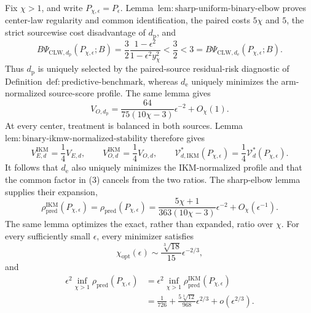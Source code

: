 Fix \(\chi>1\), and write \(P_{\chi,\epsilon}=P_\epsilon\).  Lemma~\(\mathrm{lem{:}sharp\text{-}uniform\text{-}binary\text{-}elbow}\) proves center-law regularity and common identification, the paired costs \(5\chi\) and \(5\), the strict sourcewise cost disadvantage of \(d_{\mathrm p}\), and
\[
 B\Psi_{\mathrm{CLW},d_{\mathrm p}}(P_{\chi,\epsilon};B)
 =\frac32\frac{1-\epsilon^2}{1-\epsilon^2y_\chi^2}
 <\frac32<3
 =B\Psi_{\mathrm{CLW},d_{\mathrm e}}(P_{\chi,\epsilon};B). \tag{1}
\]
Thus \(d_{\mathrm p}\) is uniquely selected by the paired-source residual-risk diagnostic of Definition~\(\mathrm{def{:}predictive\text{-}benchmark}\), whereas \(d_{\mathrm e}\) uniquely minimizes the arm-normalized source-score profile.  The same lemma gives
\[
 V_{O,d_{\mathrm p}}
 =\frac{64}{75(10\chi-3)}\epsilon^{-2}+O_\chi(1).       \tag{2}
\]
At every center, treatment is balanced in both sources.  Lemma~\(\mathrm{lem{:}binary\text{-}ikmw\text{-}normalized\text{-}stability}\) therefore gives
\[
 V_{E,d}^{\mathrm{IKM}}=\frac14V_{E,d},\qquad
 V_{O,d}^{\mathrm{IKM}}=\frac14V_{O,d},\qquad
 \mathcal V_{d,\mathrm{IKM}}^*(P_{\chi,\epsilon})
 =\frac14\mathcal V_d^*(P_{\chi,\epsilon}).             \tag{3}
\]
It follows that \(d_{\mathrm e}\) also uniquely minimizes the IKM-normalized profile and that the common factor in (3) cancels from the two ratios.  The sharp-elbow lemma supplies their expansion,
\[
 \rho_{\mathrm{pred}}^{\mathrm{IKM}}(P_{\chi,\epsilon})
 =\rho_{\mathrm{pred}}(P_{\chi,\epsilon})
 =\frac{5\chi+1}{363(10\chi-3)}\epsilon^{-2}
  +O_\chi(\epsilon^{-1}).                               \tag{4}
\]
The same lemma optimizes the exact, rather than expanded, ratio over \(\chi\).  For every sufficiently small \(\epsilon\), every minimizer satisfies
\[
 \chi_{\mathrm{opt}}(\epsilon)
 \sim\frac{\sqrt[3]{18}}{15}\epsilon^{-2/3},            \tag{5}
\]
and
\[
\begin{aligned}
 \epsilon^2\inf_{\chi>1}\rho_{\mathrm{pred}}(P_{\chi,\epsilon})
 &=\epsilon^2\inf_{\chi>1}
 \rho_{\mathrm{pred}}^{\mathrm{IKM}}(P_{\chi,\epsilon})\\
 &=\frac1{726}+\frac{5\sqrt[3]{12}}{968}\epsilon^{2/3}
  +o(\epsilon^{2/3}).                                    \tag{6}
\end{aligned}
\]

